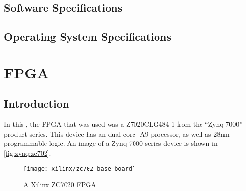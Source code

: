 \subsection{Software Specifications}
\label{specs:ubuntu-vm:software}
\begin{specifications}
\end{specifications}

\subsection{Operating System Specifications}
\label{specs:ubuntu-vm:os}
\begin{specifications}
\end{specifications}

\section{FPGA}
\label{specs:fpga}
\label{zynq}

\subsection{Introduction}
\label{specs:fpga:introduction}
\label{zynq:introduction}
\nocite{Zynq7000:ProductBrief,Zynq7000:UserGuide}
In this \thesis{}, the \gls{FPGA} that was used was a \Xilinx{} Z7020CLG484-1
from the ``Zynq-7000'' product series. This device has an \ARM{} dual-core
\Cortex{}-A9 processor, as well as \Xilinx{} 28nm programmable logic. An image
of a \Xilinx{} Zynq-7000 series device is shown in \autoref{fig:zynq:zc702}.

\begin{figure}
    \centering
    \texttt{[image: xilinx/zc702-base-board]}
    \caption{A Xilinx ZC7020 \gls{FPGA}}
    \label{fig:zynq:zc702}
\end{figure}

